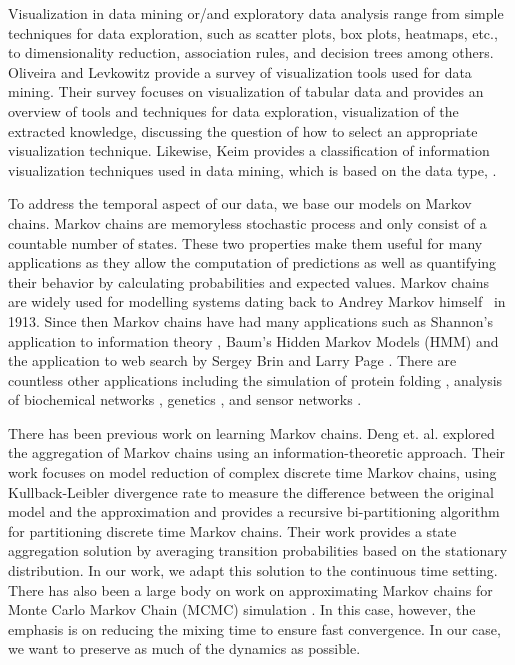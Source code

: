 Visualization in data mining or/and exploratory data analysis range from simple techniques for data exploration, such as
scatter plots, box plots, heatmaps, etc., to dimensionality reduction, %
association rules, and decision trees among others.  %
%
Oliveira and Levkowitz \cite{1207445} provide a survey of visualization tools used for data mining. Their survey focuses
on visualization of tabular data and provides an overview of tools and techniques for data exploration,
visualization of the extracted knowledge, discussing the question of how to select an appropriate visualization
technique.
%
Likewise, Keim \cite{981847} provides a classification of information visualization techniques used in data mining, which is based on
the data type, .

To address the temporal aspect of our data, we base our models on  Markov chains. Markov chains are memoryless stochastic process and only consist of a countable number of states. These two properties make them useful for many applications as they allow the computation of predictions as
well as quantifying their behavior by calculating probabilities and expected values. Markov chains are widely used for modelling systems dating back to Andrey Markov himself~\cite{markov13} in 1913. Since then
Markov chains have had many applications such as Shannon's application to information theory \cite{Shannon:1948},
Baum's Hidden Markov Models (HMM) \cite{baum1970} and the application to web search by Sergey Brin and Larry Page \cite{Lawrence981}. 
%
There are countless other applications including the simulation of protein folding \cite{pande-beauchamp-bowman:2010:methods:markov-model-review},
analysis of biochemical networks \cite{Ciocchetta2009145},
genetics \cite{Huelsenbeck2310}, and 
sensor networks \cite{DBLP:journals/corr/AlsheikhHNTL15}.%

There has been previous work on learning Markov chains. Deng et. al. \cite{5746509} explored the aggregation of Markov chains using an information-theoretic
approach. Their work focuses on model reduction of complex discrete time Markov chains, using Kullback-Leibler divergence
rate to measure the difference between the original model and the approximation and provides a recursive bi-partitioning
algorithm for partitioning discrete time Markov chains. Their work provides a state aggregation solution by averaging
transition probabilities based on the stationary distribution. In our work, we adapt this solution to the continuous time
setting.
%
There has also been a large body on work on approximating Markov chains for Monte Carlo Markov Chain (MCMC) simulation \cite{RSSD:RSSD117,HASTINGS01041970}.
In this case, however, the emphasis is on reducing the mixing time to ensure fast convergence. In our case, we want to preserve as much of the dynamics as possible. 


